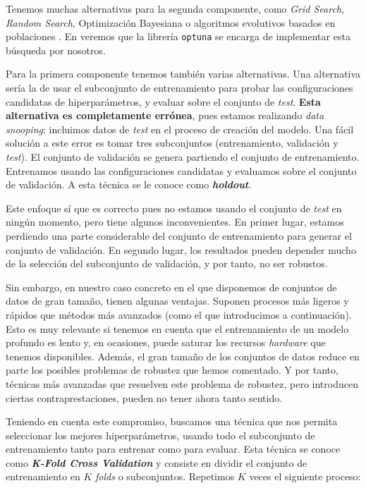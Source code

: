 Tenemos muchas alternativas para la segunda componente, como \textit{Grid Search}, \textit{Random Search}, Optimización Bayesiana o algoritmos evolutivos basados en poblaciones \cite{informatica:review_algoritmos_hp}. En  veremos que la librería \lstinline{optuna} se encarga de implementar esta búsqueda por nosotros.

Para la primera componente tenemos también varias alternativas. Una alternativa sería la de usar el subconjunto de entrenamiento para probar las configuraciones candidatas de hiperparámetros, y evaluar sobre el conjunto de \textit{test}. \textbf{Esta alternativa es completamente errónea}, pues estamos realizando \textit{data snooping}: incluimos datos de \textit{test} en el proceso de creación del modelo. Una fácil solución a este error es tomar tres subconjuntos (entrenamiento, validación y \textit{test}). El conjunto de validación se genera partiendo el conjunto de entrenamiento. Entrenamos usando las configuraciones candidatas y evaluamos sobre el conjunto de validación. A esta técnica se le conoce como \textbf{\textit{holdout}}.

Este enfoque sí que es correcto pues no estamos usando el conjunto de \textit{test} en ningún momento, pero tiene algunos inconvenientes. En primer lugar, estamos perdiendo una parte considerable del conjunto de entrenamiento para generar el conjunto de validación. En segundo lugar, los resultados pueden depender mucho de la selección del subconjunto de validación, y por tanto, no ser robustos.

Sin embargo, en nuestro caso concreto en el que disponemos de conjuntos de datos de gran tamaño, tienen algunas ventajas. Suponen procesos más ligeros y rápidos que métodos más avanzados (como el que introducimos a continuación). Esto es muy relevante si tenemos en cuenta que el entrenamiento de un modelo profundo es lento y, en ocasiones, puede saturar los recursos \textit{hardware} que tenemos disponibles. Además, el gran tamaño de los conjuntos de datos reduce en parte los posibles problemas de robustez que hemos comentado. Y por tanto, técnicas más avanzadas que resuelven este problema de robustez, pero introducen ciertas contraprestaciones, pueden no tener ahora tanto sentido.

Teniendo en cuenta este compromiso, buscamos una técnica que nos permita seleccionar los mejores hiperparámetros, usando todo el subconjunto de entrenamiento tanto para entrenar como para evaluar. Esta técnica se conoce como \textbf{\textit{K-Fold Cross Validation}} \cite{informatica:kfold_cross_val_paper} y consiste en dividir el conjunto de entrenamiento en $K$ \textit{folds} o subconjuntos. Repetimos $K$ veces el siguiente proceso:

